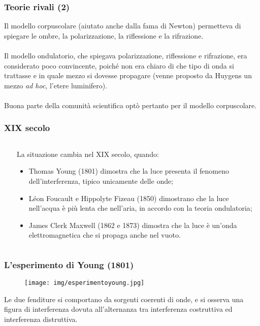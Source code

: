 \documentclass[]{beamer}
\theoremstyle{plain}
\begin{document}
\begin{frame}
\frametitle{Teorie rivali (2)}
Il modello corpuscolare (aiutato anche dalla fama di Newton) permetteva di spiegare le ombre, la polarizzazione, la riflessione e la rifrazione.\pause\\~\\
Il modello ondulatorio, che spiegava polarizzazione, riflessione e rifrazione, era considerato poco convincente, poiché non era chiaro di che tipo di onda si trattasse e in quale mezzo si dovesse propagare (venne proposto da Huygens un mezzo \emph{ad hoc}, l'etere luminifero).
\pause\\~\\
Buona parte della comunità scientifica optò pertanto per il modello corpuscolare.
\end{frame}


\begin{frame}
\frametitle{XIX secolo}
\begin{columns}
\begin{column}{0.2\textwidth}
~
\end{column}
\begin{column}{0.7\textwidth}
La situazione cambia nel XIX secolo, quando:
\begin{itemize}
  \item<1-> Thomas Young (1801) dimostra che la luce presenta il \alert<1>{fenomeno dell'interferenza, tipico unicamente delle onde};
  \item<2-> Léon Foucault e Hippolyte Fizeau (1850) dimostrano che la luce nell'acqua è più lenta che nell'aria, \alert<2>{in accordo con la teoria ondulatoria};
  \item<3-> James Clerk Maxwell (1862 e 1873) dimostra che \alert<3>{la luce è un'onda elettromagnetica} che si propaga anche nel vuoto.
\end{itemize}

\end{column}
\end{columns}
\end{frame}


\begin{frame}
\frametitle{L'esperimento di Young (1801)}
\begin{figure}
\texttt{[image: img/esperimentoyoung.jpg]}
\end{figure}

Le due fenditure si comportano da sorgenti coerenti di onde, e si osserva una \alert{figura di interferenza} dovuta all'alternanza tra interferenza costruttiva ed interferenza distruttiva. 

\begin{center}
\href{gif/young.gif}{}
\end{center}
\end{frame}
\end{document}
